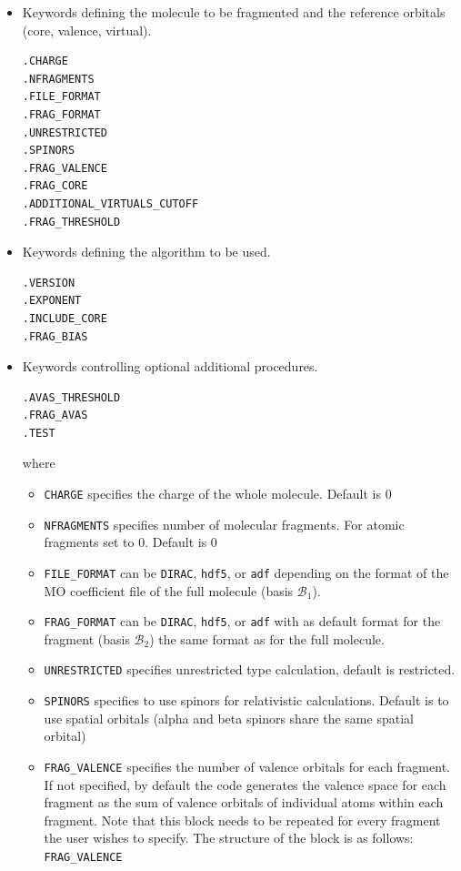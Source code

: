 \documentclass[preprint]{revtex4-1}
\begin{document}
\begin{itemize}
\item{Keywords defining the molecule to be fragmented and the reference orbitals (core, valence, virtual).}
\begin{lstlisting}[language=bash]
.CHARGE
.NFRAGMENTS
.FILE_FORMAT
.FRAG_FORMAT
.UNRESTRICTED
.SPINORS
.FRAG_VALENCE
.FRAG_CORE
.ADDITIONAL_VIRTUALS_CUTOFF
.FRAG_THRESHOLD
\end{lstlisting}
\item{Keywords defining the algorithm to be used.}
\begin{lstlisting}[language=bash]
.VERSION
.EXPONENT
.INCLUDE_CORE
.FRAG_BIAS
\end{lstlisting}
\item{Keywords controlling optional additional procedures.}
\begin{lstlisting}[language=bash]
.AVAS_THRESHOLD
.FRAG_AVAS
.TEST
\end{lstlisting}
where 
\begin{itemize}
\item \verb|CHARGE| specifies the charge of the whole molecule. Default is 0
\item \verb|NFRAGMENTS| specifies number of molecular fragments. For atomic fragments set to 0. Default is 0
\item \verb|FILE_FORMAT| can be \verb|DIRAC|, \verb|hdf5|, or \verb|adf| depending on the format of the MO coefficient 
file of the full molecule (basis $\mathcal{B}_1$).
\item \verb|FRAG_FORMAT| can be \verb|DIRAC|, \verb|hdf5|, or \verb|adf| 
with as default format for the fragment (basis $\mathcal{B}_2$) the same format as for the full molecule.
\item \verb|UNRESTRICTED| specifies unrestricted type calculation, default is restricted.
\item \verb|SPINORS| specifies to use spinors for 
relativistic calculations. Default is  to use spatial orbitals (alpha and beta spinors share the same spatial orbital)
\item \verb|FRAG_VALENCE| specifies the number of valence orbitals for each fragment. If not specified, by default the code generates the valence space for each fragment as the sum of valence orbitals of individual atoms within each fragment. Note that this block needs to be repeated for every fragment the user wishes to specify. The structure of the block is as follows: \\
\verb|FRAG_VALENCE| \\

\end{itemize}
\end{itemize}
\end{document}
